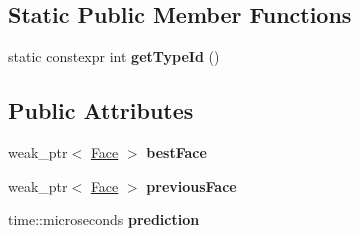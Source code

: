 \subsection*{Static Public Member Functions}
\begin{DoxyCompactItemize}
\item 
static constexpr int {\bfseries get\+Type\+Id} ()\hypertarget{classnfd_1_1fw_1_1NccStrategy_1_1MeasurementsEntryInfo_adbb813197c76675dd37f5fa4532fb7af}{}\label{classnfd_1_1fw_1_1NccStrategy_1_1MeasurementsEntryInfo_adbb813197c76675dd37f5fa4532fb7af}

\end{DoxyCompactItemize}
\subsection*{Public Attributes}
\begin{DoxyCompactItemize}
\item 
weak\+\_\+ptr$<$ \hyperlink{classnfd_1_1Face}{Face} $>$ {\bfseries best\+Face}\hypertarget{classnfd_1_1fw_1_1NccStrategy_1_1MeasurementsEntryInfo_a29e4b0256fd3796c5d7c9711f508a07d}{}\label{classnfd_1_1fw_1_1NccStrategy_1_1MeasurementsEntryInfo_a29e4b0256fd3796c5d7c9711f508a07d}

\item 
weak\+\_\+ptr$<$ \hyperlink{classnfd_1_1Face}{Face} $>$ {\bfseries previous\+Face}\hypertarget{classnfd_1_1fw_1_1NccStrategy_1_1MeasurementsEntryInfo_a5f652aa51ef58a3307f37ecb071e078d}{}\label{classnfd_1_1fw_1_1NccStrategy_1_1MeasurementsEntryInfo_a5f652aa51ef58a3307f37ecb071e078d}

\item 
time\+::microseconds {\bfseries prediction}\hypertarget{classnfd_1_1fw_1_1NccStrategy_1_1MeasurementsEntryInfo_a44d00500482e92ae2c1f4c6076982681}{}\label{classnfd_1_1fw_1_1NccStrategy_1_1MeasurementsEntryInfo_a44d00500482e92ae2c1f4c6076982681}

\end{DoxyCompactItemize}
